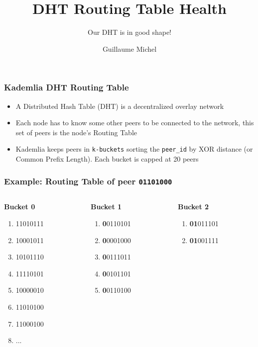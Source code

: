 \documentclass{pl-slide}
\title{DHT Routing Table Health}
\subtitle{Our DHT is in good shape!}
\author{Guillaume Michel}
\institute{Protocol Labs}
\date{\DTMdate{2022-07-15}}
\begin{document}
\frame{\titlepage}

\begin{frame}
\frametitle{Kademlia DHT Routing Table}
\begin{itemize}
	\item A Distributed Hash Table (DHT) is a decentralized overlay network
	\item Each node has to know some other peers to be connected to the network, this set of peers is the node's Routing Table
	\item Kademlia keeps peers in \texttt{k-buckets} sorting the \texttt{peer\_id} by XOR distance (or Common Prefix Length). Each bucket is capped at 20 peers
\end{itemize}
\end{frame}

\iffalse
\begin{frame}
\frametitle{Example: Routing Table of peer \texttt{01101000}}
\begin{columns}[onlytextwidth,t]
\begin{column}{0.19\textwidth}
	\textbf{Bucket 0}
   	\begin{enumerate}
   		\item 11010111
   		\item 10001011
   		\item 10101110
   		\item 11110101
   		\item 10000010
   		\item 11010100
   		\item 11000100
   		\item ...
   	\end{enumerate}
\end{column}
\begin{column}{0.19\textwidth}
	\textbf{Bucket 1}
   \begin{enumerate}
   		\item \textbf{0}0110101
   		\item \textbf{0}0001000
   		\item \textbf{0}0111011
   		\item \textbf{0}0101101
   		\item \textbf{0}0110100
   \end{enumerate}
\end{column}
\begin{column}{0.19\textwidth}
	\textbf{Bucket 2}
   \begin{enumerate}
   		\item \textbf{01}011101
   		\item \textbf{01}001111

\end{enumerate}
\end{column}
\end{columns}
\end{frame}
\end{document}
